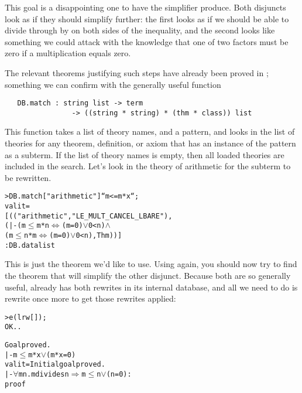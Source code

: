 This goal is a disappointing one to have the simplifier produce.
Both disjuncts look as if they should simplify further:
the first looks as if we should be able to divide through by  on both sides of the inequality, and the second looks like something we could attack with the knowledge that one of two factors must be zero if a multiplication equals zero.

The relevant theorems justifying such steps have already been proved in ; something we can confirm with the generally useful  function


\begin{holboxed}
\begin{verbatim}
   DB.match : string list -> term
                -> ((string * string) * (thm * class)) list
\end{verbatim}
\end{holboxed}
This function takes a list of theory names, and a pattern, and looks in the list of theories for any theorem, definition, or axiom that has an instance of the pattern as a subterm.
If the list of theory names is empty, then all loaded theories are
included in the search.
Let's look in the theory of arithmetic for the subterm to be rewritten.

\begin{session}
\begin{alltt}
> DB.match ["arithmetic"] ``m <= m * x``;
val it =
   [(("arithmetic", "LE_MULT_CANCEL_LBARE"),
     (|- (m \(\le\) m * n \(\iff\) (m = 0) \(\lor\) 0 < n) \(\land\)
         (m \(\le\) n * m \(\iff\) (m = 0) \(\lor\) 0 < n), Thm))]
   : DB.data list
\end{alltt}
\end{session}

This is just the theorem we'd like to use.
Using  again, you should now try to find the theorem that will simplify the other disjunct.
Because both are so generally useful,  already has both rewrites in its internal database, and all we need to do is rewrite once more to get those rewrites applied:
\begin{session}
\begin{alltt}
> e (lrw[]);
OK..

Goal proved.
|- m \(\le\) m * x \(\lor\) (m * x = 0)
val it = Initial goal proved.
|- \(\forall\)m n. m divides n \(\Rightarrow\) m \(\le\) n \(\lor\) (n = 0):
   proof
\end{alltt}
\end{session}

